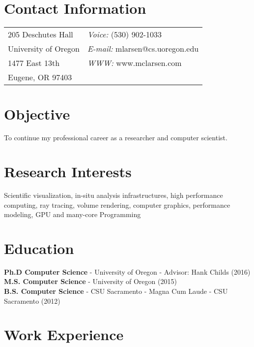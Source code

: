 \documentclass[margin,line]{res}
\begin{document}

\begin{resume}
\section{\sc Contact Information}
\vspace{.05in}
\begin{tabular}{@{}p{2in}p{4in}}
205 Deschutes Hall     & {\it Voice:}  (530) 902-1033 \\            
University of Oregon   &  {\it E-mail:}  mlarsen@cs.uoregon.edu\\         
1477 East 13th         &  {\it WWW:} www.mclarsen.com\\       
Eugene, OR 97403       &  \\     
\end{tabular}

\section{\sc Objective}
To continue my professional career as a researcher and computer scientist.
\section{\sc Research Interests}
Scientific visualization, in-situ analysis infrastructures, high performance computing, ray tracing, volume rendering, computer graphics, performance modeling, GPU and many-core Programming

\section{\sc Education}
\textbf{Ph.D Computer Science} - University of Oregon - Advisor: Hank Childs (2016)
\\
\textbf{M.S. Computer Science} - University of Oregon (2015)
\\
\textbf{B.S. Computer Science} - CSU Sacramento - Magna Cum Laude - CSU Sacramento (2012)%

\section{\sc Work Experience}


\end{resume}
\end{document}
